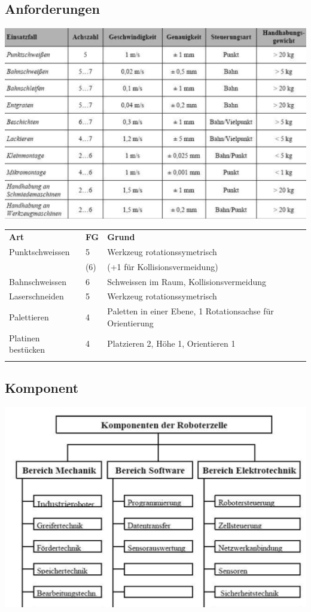 \begin{minipage}{0.5\linewidth}
\subsection{Anforderungen}
\includegraphics[width=\linewidth]{./bilder/anforderung.png}
\begin{tabular}{lll}
	\textbf{Art}& \textbf{FG}&\textbf{Grund}\\
	Punktschweissen& 5& Werkzeug rotationssymetrisch\\
	&(6)&(+1 für Kollisionsvermeidung)\\
	Bahnschweissen&6&Schweissen im Raum, Kollisionsvermeidung\\
	Laserschneiden&5&Werkzeug rotationssymetrisch\\
	Palettieren&4&Paletten in einer Ebene, 1 Rotationsachse für Orientierung\\
	Platinen bestücken&4&Platzieren 2, Höhe 1, Orientieren 1\\
	&&\\
\end{tabular}
\end{minipage}

\begin{minipage}{0.5\linewidth}
    \subsection{Komponent}
    \includegraphics[width=\linewidth]{./bilder/komponent.png}
\end{minipage}

